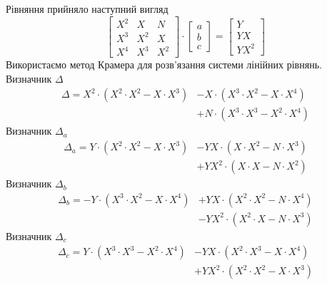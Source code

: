 Рівняння прийняло наступний вигляд
\begin{equation*}
  \begin{bmatrix}
    X^2 & X   & N \\
    X^3 & X^2 & X \\
    X^4 & X^3 & X^2
  \end{bmatrix}
  \cdot
  \begin{bmatrix}
    a \\
    b \\
    c
  \end{bmatrix}
  =
  \begin{bmatrix}
    Y \\
    YX \\
    YX^2
  \end{bmatrix}
\end{equation*}
Використаємо метод Крамера для розв’язання системи лінійних рівнянь.
Визначник $\Delta$
\begin{equation*}
  \begin{split}
    \Delta
    = X^2 \cdot \left( X^2 \cdot X^2 - X  \cdot X^3 \right)
       &- X \cdot \left( X^3 \cdot X^2 - X  \cdot X^4 \right) \\
       &+ N \cdot \left( X^3 \cdot X^3 - X^2 \cdot X^4 \right)
  \end{split}
\end{equation*}
Визначник $\Delta_a$
\begin{equation*}
  \begin{split}
    \Delta_a
    =     Y   \cdot \left( X^2 \cdot X^2 - X \cdot X^3 \right)
      &- YX   \cdot \left( X   \cdot X^2 - N \cdot X^3 \right) \\
      &+ YX^2 \cdot \left( X   \cdot X   - N \cdot X^2 \right)
  \end{split}
\end{equation*}
Визначник $\Delta_b$
\begin{equation*}
  \begin{split}
    \Delta_b
    =  -  Y   \cdot \left( X^3 \cdot X^2 - X \cdot X^4 \right)
      &+ YX   \cdot \left( X^2 \cdot X^2 - N \cdot X^4 \right) \\
      &- YX^2 \cdot \left( X^2 \cdot X   - N \cdot X^3 \right)
  \end{split}
\end{equation*}
Визначник $\Delta_c$
\begin{equation*}
  \begin{split}
    \Delta_c
    =     Y   \cdot \left( X^3 \cdot X^3 - X^2 \cdot X^4 \right)
      &- YX   \cdot \left( X^2 \cdot X^3 - X   \cdot X^4 \right) \\
      &+ YX^2 \cdot \left( X^2 \cdot X^2 - X   \cdot X^3 \right)
  \end{split}
\end{equation*}
